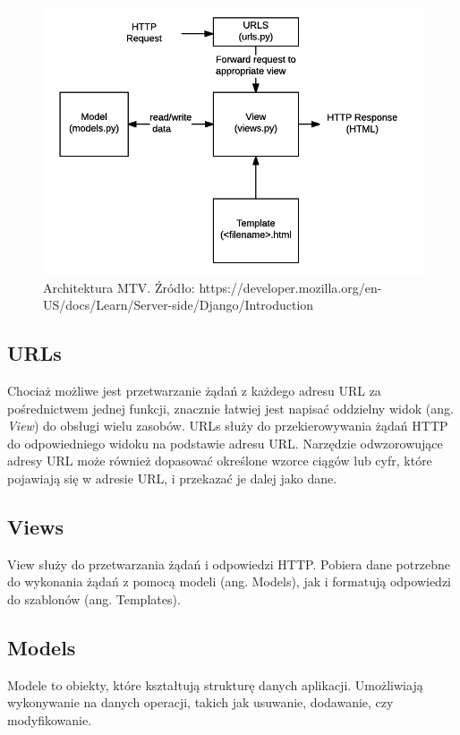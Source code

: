 \documentclass[oneside,polski,logo,indent]{amuthesis}
\begin{document}
\begin{figure}[H]
\centering
\includegraphics[width=14cm]{mtv.png}
\caption{Architektura MTV. Źródło: https://developer.mozilla.org/en-US/docs/Learn/Server-side/Django/Introduction}
\label{MTV}
\end{figure}

\begin{center}
\subsection{URLs}
\end{center}
Chociaż możliwe jest przetwarzanie żądań z każdego adresu URL za pośrednictwem jednej funkcji, znacznie łatwiej jest napisać oddzielny widok (ang. \emph{View}) do obsługi wielu zasobów. URLs służy do przekierowywania żądań HTTP do odpowiedniego widoku na podstawie adresu URL. Narzędzie odwzorowujące adresy URL może również dopasować określone wzorce ciągów lub cyfr, które pojawiają się w adresie URL, i przekazać je dalej jako dane.

\begin{center}
\subsection{Views}
\end{center}
View służy do przetwarzania żądań i odpowiedzi HTTP. Pobiera dane potrzebne do wykonania żądań z pomocą modeli (ang. Models), jak i formatują odpowiedzi do szablonów (ang. Templates).


\begin{center}
\subsection{Models}
\end{center}
Modele to obiekty, które kształtują strukturę danych aplikacji. Umożliwiają wykonywanie na danych operacji, takich jak usuwanie, dodawanie, czy modyfikowanie. 
\end{document}
